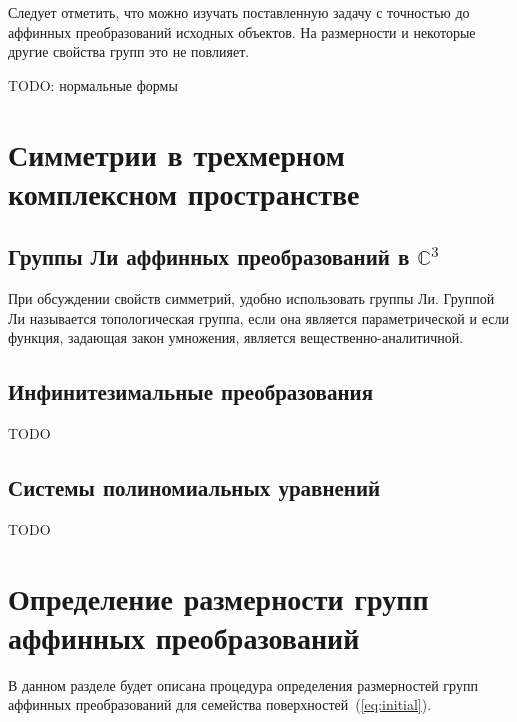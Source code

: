\documentclass[a4paper,14pt]{extarticle}
\begin{document}
Следует отметить, что можно изучать поставленную задачу с точностью до аффинных преобразований исходных объектов. На размерности и некоторые другие свойства групп это не повлияет.

TODO: нормальные формы

\section{Симметрии в трехмерном комплексном пространстве}

\subsection{Группы Ли аффинных преобразований в $\mathbb{C}^3$}
При обсуждении свойств симметрий, удобно использовать группы Ли. Группой Ли называется топологическая группа, если она является параметрической и если функция, задающая закон умножения, является вещественно-аналитичной.

\subsection{Инфинитезимальные преобразования}
TODO
\subsection{Системы полиномиальных уравнений}
TODO
 

\section{Определение размерности групп аффинных преобразований}
В данном разделе будет описана процедура определения размерностей групп аффинных преобразований для семейства поверхностей~(\ref{eq:initial}).
\end{document}
